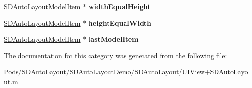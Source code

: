 \begin{DoxyCompactItemize}
\mbox{\hyperlink{interface_s_d_auto_layout_model_item}{S\+D\+Auto\+Layout\+Model\+Item}} $\ast$ {\bfseries width\+Equal\+Height}
\item 
\mbox{\label{category_s_d_auto_layout_model_07_08_a73fc3862848c901aee39e44f0ec28673}} 
\mbox{\hyperlink{interface_s_d_auto_layout_model_item}{S\+D\+Auto\+Layout\+Model\+Item}} $\ast$ {\bfseries height\+Equal\+Width}
\item 
\mbox{\label{category_s_d_auto_layout_model_07_08_aaf2b40f739d136808fc47d304f23d643}} 
\mbox{\hyperlink{interface_s_d_auto_layout_model_item}{S\+D\+Auto\+Layout\+Model\+Item}} $\ast$ {\bfseries last\+Model\+Item}
\end{DoxyCompactItemize}


The documentation for this category was generated from the following file\+:\begin{DoxyCompactItemize}
\item 
Pods/\+S\+D\+Auto\+Layout/\+S\+D\+Auto\+Layout\+Demo/\+S\+D\+Auto\+Layout/U\+I\+View+\+S\+D\+Auto\+Layout.\+m\end{DoxyCompactItemize}
